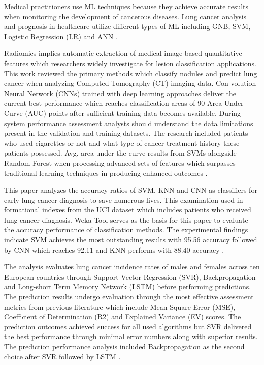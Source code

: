 \documentclass[runningheads]{llncs}
\begin{document}
Medical practitioners use ML techniques because they achieve accurate results when monitoring the development of cancerous diseases. Lung cancer analysis and prognosis in healthcare utilize different types of ML including GNB, SVM, Logistic Regression (LR) and ANN \cite{kadir2018}. 

Radiomics implies automatic extraction of medical image-based quantitative features which researchers widely investigate for lesion classification applications. This work reviewed the primary methods which classify nodules and predict lung cancer when analyzing Computed Tomography (CT) imaging data. Con-volution Neural Network (CNNs) trained with deep learning approaches deliver the current best performance which reaches classification areas of 90 Area Under Curve (AUC) points after sufficient training data becomes available. During system performance assessment analysts should understand the data limitations present in the validation and training datasets. The research included patients who used cigarettes or not and what type of cancer treatment history these patients possessed. Avg. area under the curve results from SVMs alongside Random Forest when processing advanced sets of features which surpasses traditional learning techniques in producing enhanced outcomes \cite{tuncal2020}.

This paper analyzes the accuracy ratios of SVM, KNN and CNN as classifiers for early lung cancer diagnosis to save numerous lives. This examination used in-formational indexes from the UCI dataset which includes patients who received lung cancer diagnosis. Weka Tool serves as the basis for this paper to evaluate the accuracy performance of classification methods. The experimental findings indicate SVM achieves the most outstanding results with 95.56 accuracy followed by CNN which reaches 92.11 and KNN performs with 88.40 accuracy \cite{chen2022}. 

The analysis evaluates lung cancer incidence rates of males and females across ten European countries through Support Vector Regression (SVR), Backpropagation and Long-short Term Memory Network (LSTM) before performing predictions. The prediction results undergo evaluation through the most effective assessment metrics from previous literature which include Mean Square Error (MSE), Coefficient of Determination (R2) and Explained Variance (EV) scores. The prediction outcomes achieved success for all used algorithms but SVR delivered the best performance through minimal error numbers along with superior results. The prediction performance analysis included Backpropagation as the second choice after SVR followed by LSTM \cite{sweet2024}. 
\end{document}
